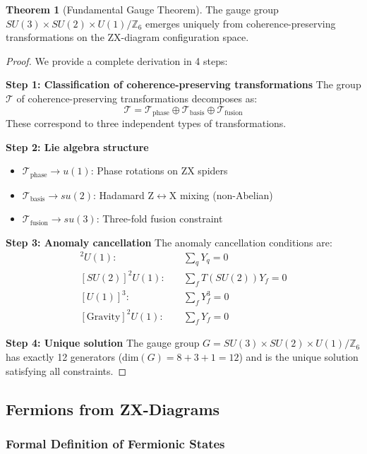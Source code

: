 \documentclass[11pt]{article}
\theoremstyle{definition}
\newtheorem{theorem}{Theorem}[section]
\begin{document}
\begin{theorem}[Fundamental Gauge Theorem]
The gauge group $SU(3) \times SU(2) \times U(1)/\mathbb{Z}_6$ emerges uniquely from coherence-preserving transformations on the ZX-diagram configuration space.
\end{theorem}

\begin{proof}
We provide a complete derivation in 4 steps:

\textbf{Step 1: Classification of coherence-preserving transformations}
The group $\mathcal{T}$ of coherence-preserving transformations decomposes as:
\begin{equation}
\mathcal{T} = \mathcal{T}_{\text{phase}} \oplus \mathcal{T}_{\text{basis}} \oplus \mathcal{T}_{\text{fusion}}
\end{equation}
These correspond to three independent types of transformations.

\textbf{Step 2: Lie algebra structure}
\begin{itemize}
\item $\mathcal{T}_{\text{phase}} \to u(1)$: Phase rotations on ZX spiders
\item $\mathcal{T}_{\text{basis}} \to su(2)$: Hadamard Z$\leftrightarrow$X mixing (non-Abelian)
\item $\mathcal{T}_{\text{fusion}} \to su(3)$: Three-fold fusion constraint
\end{itemize}

\textbf{Step 3: Anomaly cancellation}
The anomaly cancellation conditions are:
\begin{align}
[SU(3)]^2U(1): &\quad \sum_q Y_q = 0 \\
[SU(2)]^2U(1): &\quad \sum_f T(SU(2))Y_f = 0 \\
[U(1)]^3: &\quad \sum_f Y_f^3 = 0 \\
[\text{Gravity}]^2U(1): &\quad \sum_f Y_f = 0
\end{align}

\textbf{Step 4: Unique solution}
The gauge group $G = SU(3) \times SU(2) \times U(1)/\mathbb{Z}_6$ has exactly 12 generators (dim$(G) = 8+3+1 = 12$) and is the unique solution satisfying all constraints.
\end{proof}

\subsection{Fermions from ZX-Diagrams}

\subsubsection{Formal Definition of Fermionic States}
\end{document}
